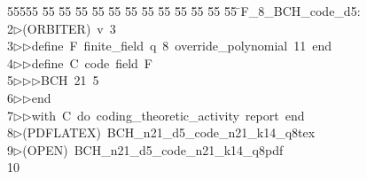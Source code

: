 %
%
\begin{tabbing}
55555 \= 55 \= 55 \= 55 \= 55 \= 55 \= 55 \= 55 \= 55 \= 55 \= 55 \= 55 \= 55 \= \>F\_8\_BCH\_code\_d5:\\[0pt]
2\>$\triangleright$\>(ORBITER)\ v\ 3\ \\[0pt]
3\>$\triangleright$\>$\triangleright$\>define\ F\ finite\_field\ q\ 8\ override\_polynomial\ 11\ end\ \\[0pt]
4\>$\triangleright$\>$\triangleright$\>define\ C\ code\ field\ F\ \\[0pt]
5\>$\triangleright$\>$\triangleright$\>$\triangleright$\>BCH\ 21\ 5\ \\[0pt]
6\>$\triangleright$\>$\triangleright$\>end\ \\[0pt]
7\>$\triangleright$\>$\triangleright$\>with\ C\ do\ coding\_theoretic\_activity\ report\ end\\[0pt]
8\>$\triangleright$\>(PDFLATEX)\ BCH\_n21\_d5\_code\_n21\_k14\_q8tex\\[0pt]
9\>$\triangleright$\>(OPEN)\ BCH\_n21\_d5\_code\_n21\_k14\_q8pdf\\[0pt]
10\>\end{tabbing}

